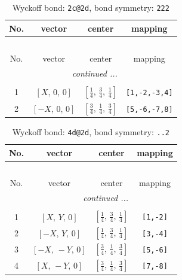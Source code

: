 \documentclass[fleqn,8pt]{jsarticle}
\begin{document}
\begin{longtable}{cccc}
\caption{Wyckoff bond: {\tt 2c@2d}, bond symmetry: {\tt 222}}
 \\
 \hline \hline
No. & vector & center & mapping \\ \hline \endfirsthead

\multicolumn{3}{l}{\tablename\ \thetable{}} \\
 \hline \hline
No. & vector & center & mapping \\ \hline \endhead

 \hline \hline
\multicolumn{3}{r}{\footnotesize\it continued ...} \\ \endfoot

 \hline \hline
\multicolumn{3}{r}{} \\ \endlastfoot

1 & $\left[ X,\, 0,\, 0 \right]$ & $\left[ \frac{1}{4},\, \frac{3}{4},\, \frac{1}{4} \right]$ & {\tt [1,-2,-3,4]} \\ \hline
2 & $\left[ - X,\, 0,\, 0 \right]$ & $\left[ \frac{3}{4},\, \frac{1}{4},\, \frac{3}{4} \right]$ & {\tt [5,-6,-7,8]} \\
\end{longtable}
\renewcommand{\arraystretch}{1.2}
\begin{longtable}{cccc}
\caption{Wyckoff bond: {\tt 4d@2d}, bond symmetry: {\tt ..2}}
 \\
 \hline \hline
No. & vector & center & mapping \\ \hline \endfirsthead

\multicolumn{3}{l}{\tablename\ \thetable{}} \\
 \hline \hline
No. & vector & center & mapping \\ \hline \endhead

 \hline \hline
\multicolumn{3}{r}{\footnotesize\it continued ...} \\ \endfoot

 \hline \hline
\multicolumn{3}{r}{} \\ \endlastfoot

1 & $\left[ X,\, Y,\, 0 \right]$ & $\left[ \frac{1}{4},\, \frac{3}{4},\, \frac{1}{4} \right]$ & {\tt [1,-2]} \\ \hline
2 & $\left[ - X,\, Y,\, 0 \right]$ & $\left[ \frac{1}{4},\, \frac{3}{4},\, \frac{1}{4} \right]$ & {\tt [3,-4]} \\ \hline
3 & $\left[ - X,\, - Y,\, 0 \right]$ & $\left[ \frac{3}{4},\, \frac{1}{4},\, \frac{3}{4} \right]$ & {\tt [5,-6]} \\ \hline
4 & $\left[ X,\, - Y,\, 0 \right]$ & $\left[ \frac{3}{4},\, \frac{1}{4},\, \frac{3}{4} \right]$ & {\tt [7,-8]} \\
\end{longtable}
\end{document}
